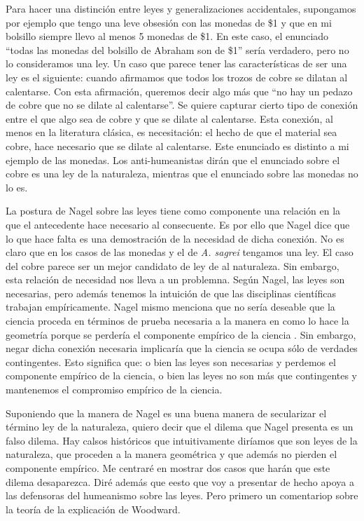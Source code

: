 Para hacer una distinción entre leyes y generalizaciones accidentales, supongamos por ejemplo que tengo una leve obsesión con las monedas de \$1 y que en mi bolsillo siempre llevo al menos 5 monedas de \$1. En este caso, el enunciado ``todas las monedas del bolsillo de Abraham son de \$1'' sería verdadero, pero no lo consideramos una ley. Un caso que parece tener las características de ser una ley es el siguiente: cuando afirmamos que todos los trozos de cobre se dilatan al calentarse.  Con esta afirmación, queremos decir algo más que ``no hay un pedazo de cobre que no se dilate al calentarse''. Se quiere capturar cierto tipo de conexión entre el que algo sea de cobre y que se dilate al calentarse. Esta conexión, al menos en la literatura clásica, es necesitación: el hecho de que el material sea cobre, hace necesario que se dilate al calentarse. Este enunciado es distinto a mi ejemplo de las monedas. Los anti-humeanistas dirán que el enunciado sobre el cobre es una ley de la naturaleza, mientras que el enunciado sobre las monedas no lo es.

La postura de Nagel sobre las leyes tiene como componente una relación en la que el antecedente hace necesario al consecuente. Es por ello que Nagel dice que lo que hace falta es una demostración de la necesidad de dicha conexión. No es claro que en los casos de las monedas y el de \emph{A. sagrei} tengamos una ley. El caso del cobre parece ser un mejor candidato de ley de al naturaleza. Sin embargo, esta relación de necesidad nos lleva a un problemna. Según Nagel, las leyes son necesarias, pero además tenemos la intuición de que las disciplinas científicas trabajan empíricamente. Nagel mismo menciona que no sería deseable que la ciencia proceda en términos de prueba necesaria a la manera en como lo hace la geometría \cite[cfr., p. 53]{Nagel2006} porque se perdería el componente empírico de la ciencia . Sin embargo, negar dicha conexión necesaria implicaría que la ciencia se ocupa sólo de verdades contingentes. Esto significa que: o bien las leyes son necesarias y perdemos el componente empírico de la ciencia, o bien las leyes no son más que contingentes y mantenemos el compromiso empírico de la ciencia.

Suponiendo que la manera de Nagel es una buena manera de secularizar el término ley de la naturaleza, quiero decir que el dilema que Nagel presenta es un falso dilema. Hay calsos históricos que intuitivamente diríamos que son leyes de la naturaleza, que proceden a la manera geométrica y que además no pierden el componente empírico. Me centraré en mostrar dos casos que harán que este dilema desaparezca. Diré además que eesto que voy a presentar de hecho apoya a las defensoras del humeanismo sobre las leyes. Pero primero un comentariop sobre la teoría de la explicación de Woodward.

